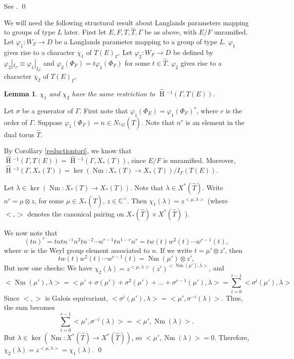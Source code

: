 \documentclass[11pt]{amsart}
\theoremstyle{plain}
\newtheorem{lemma}[theorem]{Lemma}
\newcommand{\HT}[1]{\hat{\HH}{}^{#1}}
\theoremstyle{definition}
\DeclareMathOperator{\HH}{H}
\DeclareMathOperator{\Nm}{Nm}
\begin{document}
\proof
See \cite{adrianlansky}.
\qed

We will need the following structural result about Langlands
parameters mapping to groups of type $L$ later.  First let $E,F,T,\hat{T}, \Gamma$
be as above, with $E/F$ unramified.  Let $\varphi_1 : W_F \rightarrow D$
be a Langlands parameter mapping to a group of type $L$.  $\varphi_1$
gives rise to a character $\chi_1$ of $T(E)_{\Gamma}$.  Let $\varphi_2
: W_F \rightarrow D$ be defined by $\varphi_2|_{I_F} \equiv \varphi_1|_{I_F}$ and
$\varphi_2(\Phi_F) = t \varphi_1(\Phi_F)$ for some $t \in \hat{T}$.
$\varphi_2$ gives rise to a character $\chi_2$ of $T(E)_{\Gamma}$.

\begin{lemma}\label{toralmodification}
$\chi_1$ and $\chi_2$ have the same restriction to $\HT{-1}(\Gamma, T(E))$.
\end{lemma}

\proof
Let $\sigma$ be a generator of $\Gamma$.  First note that
$\varphi_1(\Phi_E) = \varphi_1(\Phi_F)^r$, where $r$ is the
order of $\Gamma$.
Suppose $\varphi_1(\Phi_F) = n \in N_{{}^L G}(\hat{T})$.
Note that $n^r$ is an element in the dual torus
$\hat{T}$.

By Corollary \ref{reductiontori}, we know that
$\HT{-1}(\Gamma, T(E)) = \HT{-1}(\Gamma, X_*(T))$,
since $E/F$ is unramified.  Moreover,
$\HT{-1}(\Gamma, X_*(T)) = \ker(\Nm : X_*(T) \rightarrow X_*(T)) / I_{\Gamma}(T(E))$.

Let $\lambda \in \ker(\Nm : X_*(T) \rightarrow X_*(T))$.  Note that
$\lambda \in X^*(\hat{T})$.
Write $n^r = \mu \otimes z$, for some $\mu \in X_*(\hat{T})$,
$z \in \mathbb{C}^\times$.  Then $\chi_1(\lambda) = z^{<\mu, \lambda>}$
(where $< , >$ denotes the canonical pairing
on $X_*(\hat{T}) \times X^*(\hat{T})$ ).

We now note that
$$(tn)^r = t ntn^{-1} n^2 t n^{-2} \cdots n^{r-1} t n^{1-r} n^r = t w(t) w^2(t) \cdots w^{r-1}(t),$$
where $w$ is the Weyl group element associated to $n$.  If we write
$t = \mu' \otimes z'$, then $$t w(t) w^2(t) \cdots w^{r-1}(t) = \Nm(\mu' ) \otimes z',$$
But now one checks:
We have $\chi_2(\lambda) = z^{<\mu, \lambda>} (z' )^{<\Nm(\mu'), \lambda>}$, and
$$<\Nm(\mu'), \lambda> = < \mu' + \sigma(\mu') + \sigma^2(\mu') + ... + \sigma^{r-1}(\mu'), \lambda>
  = \displaystyle\sum_{i=0}^{r-1} < \sigma^i(\mu'), \lambda >$$
Since $< , >$ is Galois equivariant, $<\sigma^i(\mu'), \lambda> =
<\mu', \sigma^{-i}(\lambda)>$.  Thus, the sum
becomes
$$\displaystyle\sum_{i=0}^{r-1} <\mu', \sigma^{-i}(\lambda)> = <\mu', \Nm(\lambda)>.$$
But $\lambda \in \ker(\Nm : X^*(\hat{T}) \rightarrow X^*(\hat{T}))$, so
$<\mu', \Nm(\lambda)> = 0$.  Therefore, $\chi_2(\lambda) =
z^{<\mu, \lambda>} = \chi_1(\lambda)$.
\qed
\end{document}

